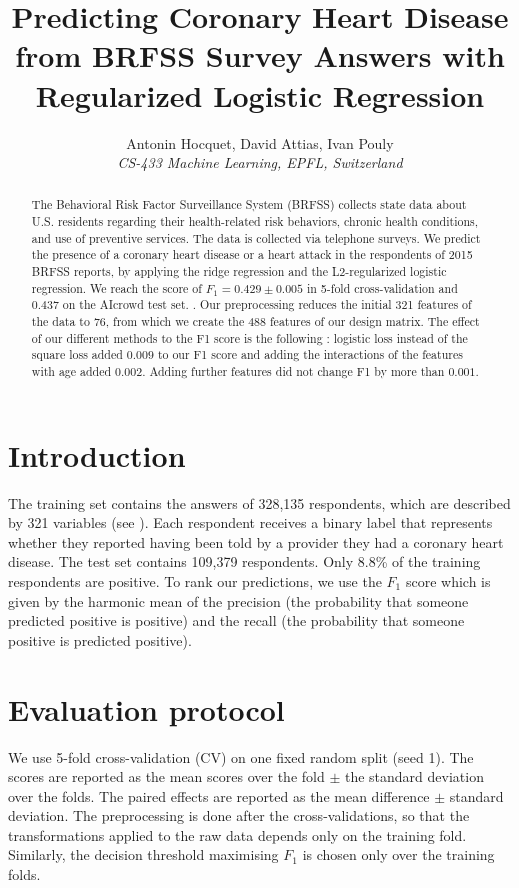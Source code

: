 \documentclass[10pt,conference,compsocconf]{IEEEtran}
\begin{document}
\title{Predicting Coronary Heart Disease from BRFSS Survey Answers with Regularized Logistic Regression}

\author{
  Antonin Hocquet, David Attias, Ivan Pouly\\
  \textit{CS-433 Machine Learning, EPFL, Switzerland}
}

\maketitle

\begin{abstract}
The Behavioral Risk Factor Surveillance System (BRFSS) collects state data about U.S. residents regarding their health-related risk behaviors, chronic health conditions, and use of preventive services. The data is collected via telephone surveys. We predict the presence of a coronary heart disease or a heart attack in the respondents of 2015 BRFSS reports, by applying the ridge regression and the L2-regularized logistic regression. We reach the score of $F_1 = 0.429 \pm 0.005$ in 5-fold cross-validation and $0.437$ on the AIcrowd test set. \cite{aicrowd2026}. Our preprocessing reduces the initial 321 features of the data to 76, from which we create the 488 features of our design matrix. The effect of our different methods to the F1 score is the following : logistic loss instead of the square loss added $0.009$ to our F1 score and adding the interactions of the features with age added $0.002$. Adding further features did not change F1 by more than $0.001$.
\end{abstract}

\section{Introduction}
The training set contains the answers of 328{,}135 respondents, which are described by 321 variables (see \cite{brfss2015}). Each respondent receives a binary label that represents whether they reported having been told by a provider they had a coronary heart disease. The test set contains 109{,}379 respondents. Only 8.8\% of the training respondents are positive. To rank our predictions, we use the $F_1$ score which is given by the harmonic mean of the precision (the probability that someone predicted positive is positive) and the recall (the probability that someone positive is predicted positive).


\section{Evaluation protocol}
We use 5-fold cross-validation (CV) on one fixed random split (seed 1). The scores are reported as the mean scores over the fold $\pm$ the standard deviation over the folds. The paired effects are reported as the mean difference $\pm$ standard deviation. The preprocessing is done after the cross-validations, so that the transformations applied to the raw data depends only on the training fold. Similarly, the decision threshold maximising $F_1$ is chosen only over the training folds.
\end{document}
